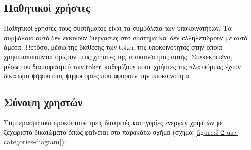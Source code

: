 \subsection{Παθητικοί χρήστες}

Παθητικοί χρήστες τους συστήματος είναι τα συμβόλαια των υποκοινοτήτων. Τα συμβόλαια αυτά δεν εκκινούν διεργασίες στο σύστημα και δεν αλληλεπιδρούν με αυτό άμεσα. Ωστόσο, μέσω της διάθεσης των token της υποκοινότητας στην οποία χρησιμοποιούνται ορίζουν τους χρήστες της υποκοινότητας αυτής. Συγκεκριμένα, μέσω του διαμοιρασμού των token καθορίζουν ποιοι χρήστες της πλατφόρμας έχουν δικαίωμα ψήφου στις ψηφοφορίες που αφορούν την υποκοινότητα.

\subsection{Σύνοψη χρηστών}

Συμπερασματικά προκύπτουν τρεις διακριτές κατηγορίες ενεργών χρηστών με ξεχωριστά δικαιώματα όπως φαίνεται στο παρακάτω σχήμα (σχήμα \ref{figure:3-2-use-categories-diagram}):

